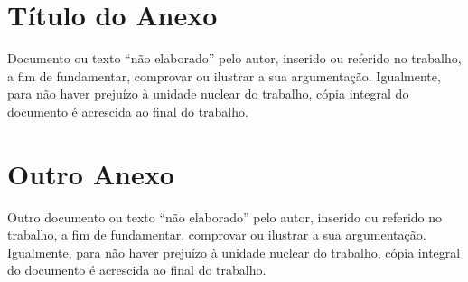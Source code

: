 \documentclass{ifto-tex}
\begin{document}
\begin{anexosenv}
	
	\partanexos
	
	\chapter{Título do Anexo}
	
		Documento ou texto “não elaborado”	pelo autor, inserido ou referido no trabalho, a fim de fundamentar, comprovar ou ilustrar a sua argumentação. Igualmente, para não haver prejuízo à unidade nuclear do trabalho, cópia integral do documento é acrescida ao final do trabalho.
		
	\chapter{Outro Anexo}
	
		Outro documento ou texto “não elaborado”	pelo autor, inserido ou referido no trabalho, a fim de fundamentar, comprovar ou ilustrar a sua argumentação. Igualmente, para não haver prejuízo à unidade nuclear do trabalho, cópia integral do documento é acrescida ao final do trabalho.
	
\end{anexosenv}
\end{document}
